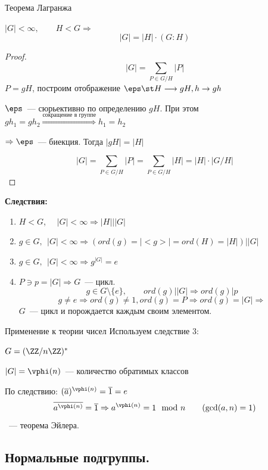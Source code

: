 \begin{Theorem}{Теорема Лагранжа}{}

    $|G| < \infty, \qquad H < G \Rightarrow$
    \[ |G| = |H|\cdot (G:H) \]
\end{Theorem}
\begin{proof}
    \[ |G| = \sum_{P \in G \slash H } |P| \]
    $P = gH$, построим отображение $\eps \st H \longrightarrow gH, h \rightarrow gh$

    $\eps$~--- сюрьективно по определению $gH$. При этом $gh_1 = gh_2 \overset{\text{сокращение в группе}}{\Rightarrow} h_1 = h_2$

    $\Rightarrow \eps$~--- биекция. Тогда $|gH| = |H|$

    \[ |G| = \sum_{P \in G \slash H } |P| = \sum_{P \in G \slash H} |H| = |H| \cdot |G \slash H| \]
\end{proof}

\textbf{Следствия:}

\begin{enumerate}
    \item $H < G$, \ \ $|G| < \infty \Rightarrow |H| | |G|$
    \item $g \in G, \ \ |G| < \infty \Rightarrow (ord(g) = |<g>| = ord(H) = |H|) | |G|$
    \item $g \in G, \ \ |G| < \infty \Rightarrow g^{|G|} = e$
    \item $P \ni p = |G| \Rightarrow G$~--- цикл.
    \[ g \in G \setminus \{e\}, \qquad ord(g) | |G| \Rightarrow ord(g) | p \]
    \[ g \not = e \Rightarrow ord(g) \not = 1, ord(g) = P \Rightarrow ord(g) = |G| \Rightarrow\]
    $G$~--- цикл и порождается каждым своим элементом.
\end{enumerate}

\begin{Example}{Применение к теории чисел}{}
    Используем следствие 3:

    $G = (\ZZ \slash n\ZZ)^*$

    $|G| = \vphi(n)$~--- количество обратимых классов

    По следствию: $(\overline{a})^{\vphi(n)} = \overline{1} = e$
    \[\overline{a^{\vphi(n)}} = \overline{1} \Rightarrow a^{\vphi(n)} = 1 \mod n \qquad (\gcd(a, n) = 1) \]~--- теорема Эйлера.
\end{Example}

\subsection{Нормальные подгруппы.}

